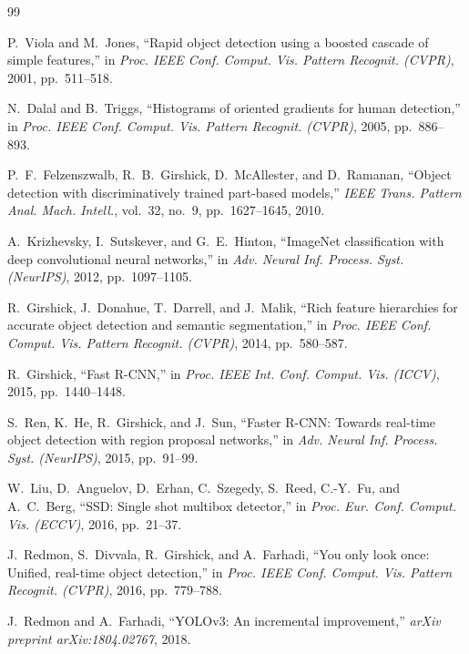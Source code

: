 \documentclass[conference]{IEEEtran}
\begin{document}
\begin{thebibliography}{99}

P.~Viola and M.~Jones, ``Rapid object detection using a boosted
cascade of simple features,'' in \textit{Proc. IEEE Conf. Comput.
Vis. Pattern Recognit. (CVPR)}, 2001, pp.~511--518.

N.~Dalal and B.~Triggs, ``Histograms of oriented gradients for
human detection,'' in \textit{Proc. IEEE Conf. Comput. Vis.
Pattern Recognit. (CVPR)}, 2005, pp.~886--893.

P.~F.~Felzenszwalb, R.~B.~Girshick, D.~McAllester, and
D.~Ramanan, ``Object detection with discriminatively trained
part-based models,'' \textit{IEEE Trans. Pattern Anal. Mach.
Intell.}, vol.~32, no.~9, pp.~1627--1645, 2010.

A.~Krizhevsky, I.~Sutskever, and G.~E.~Hinton, ``ImageNet
classification with deep convolutional neural networks,'' in
\textit{Adv. Neural Inf. Process. Syst. (NeurIPS)}, 2012,
pp.~1097--1105.

R.~Girshick, J.~Donahue, T.~Darrell, and J.~Malik, ``Rich
feature hierarchies for accurate object detection and semantic
segmentation,'' in \textit{Proc. IEEE Conf. Comput. Vis.
Pattern Recognit. (CVPR)}, 2014, pp.~580--587.

R.~Girshick, ``Fast R-CNN,'' in \textit{Proc. IEEE Int. Conf.
Comput. Vis. (ICCV)}, 2015, pp.~1440--1448.

S.~Ren, K.~He, R.~Girshick, and J.~Sun, ``Faster R-CNN: Towards
real-time object detection with region proposal networks,'' in
\textit{Adv. Neural Inf. Process. Syst. (NeurIPS)}, 2015,
pp.~91--99.

W.~Liu, D.~Anguelov, D.~Erhan, C.~Szegedy, S.~Reed,
C.-Y.~Fu, and A.~C.~Berg, ``SSD: Single shot multibox
detector,'' in \textit{Proc. Eur. Conf. Comput. Vis. (ECCV)},
2016, pp.~21--37.

J.~Redmon, S.~Divvala, R.~Girshick, and A.~Farhadi, ``You only
look once: Unified, real-time object detection,'' in \textit{Proc.
IEEE Conf. Comput. Vis. Pattern Recognit. (CVPR)}, 2016,
pp.~779--788.

J.~Redmon and A.~Farhadi, ``YOLOv3: An incremental
improvement,'' \textit{arXiv preprint arXiv:1804.02767}, 2018.


\end{thebibliography}
\end{document}

